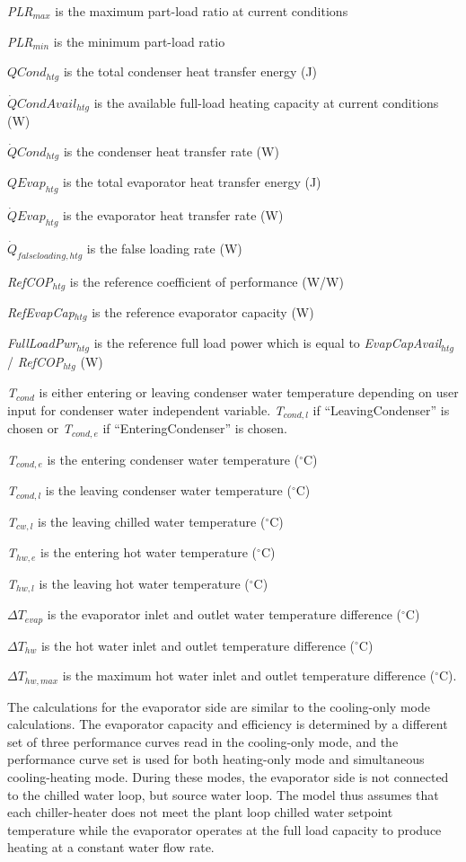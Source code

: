 \emph{PLR\(_{max}\)} is the maximum part-load ratio at current conditions

\emph{PLR\(_{min}\)} is the minimum part-load ratio

\(QCon{d_{htg}}\) is the total condenser heat transfer energy (J)

\(\dot QCondAvai{l_{htg}}\) is the available full-load heating capacity at current conditions (W)

\(\dot QCon{d_{htg}}\) is the condenser heat transfer rate (W)

\(QEva{p_{htg}}\) is the total evaporator heat transfer energy (J)

\(\dot QEva{p_{htg}}\) is the evaporator heat transfer rate (W)

\({\dot Q_{falseloading,htg}}\) is the false loading rate (W)

\emph{RefCOP\(_{htg}\)} is the reference coefficient of performance (W/W)

\emph{RefEvapCap\(_{htg}\)} is the reference evaporator capacity (W)

\emph{FullLoadPwr\(_{htg}\)} is the reference full load power which is equal to \emph{EvapCapAvail\(_{htg}\)}/ \emph{RefCOP\(_{htg}\)} (W)

\emph{T\(_{cond}\)} is either entering or leaving condenser water temperature depending on user input for condenser water independent variable. \emph{T\(_{cond,l}\)} if ``LeavingCondenser'' is chosen or \emph{T\(_{cond,e}\)} if ``EnteringCondenser'' is chosen.

\emph{T\(_{cond,e}\)} is the entering condenser water temperature (\(^{\circ}\)C)

\emph{T\(_{cond,l}\)} is the leaving condenser water temperature (\(^{\circ}\)C)

\emph{T\(_{cw,l}\)} is the leaving chilled water temperature (\(^{\circ}\)C)

\emph{T\(_{hw,e}\)} is the entering hot water temperature (\(^{\circ}\)C)

\emph{T\(_{hw,l}\)} is the leaving hot water temperature (\(^{\circ}\)C)

\(\Delta {T_{evap}}\) is the evaporator inlet and outlet water temperature difference (\(^{\circ}\)C)

\(\Delta {T_{hw}}\) is the hot water inlet and outlet temperature difference (\(^{\circ}\)C)

\(\Delta {T_{hw,max}}\) is the maximum hot water inlet and outlet temperature difference (\(^{\circ}\)C).

The calculations for the evaporator side are similar to the cooling-only mode calculations. The evaporator capacity and efficiency is determined by a different set of three performance curves read in the cooling-only mode, and the performance curve set is used for both heating-only mode and simultaneous cooling-heating mode. During these modes, the evaporator side is not connected to the chilled water loop, but source water loop. The model thus assumes that each chiller-heater does not meet the plant loop chilled water setpoint temperature while the evaporator operates at the full load capacity to produce heating at a constant water flow rate.

